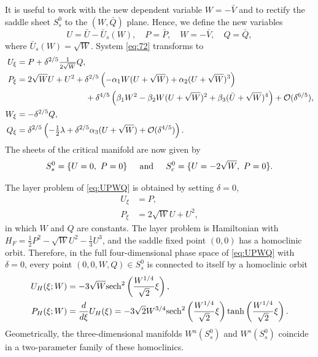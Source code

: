\documentclass[11pt]{article}
\numberwithin{equation}{section}
\begin{document}
It is useful to work with the new dependent variable $W= - \bar{V}$ and to rectify the saddle sheet $S_s^0$ to the $(W,\bar{Q})$ plane.
Hence, we define the new variables
\begin{equation}
    U = \bar{U} - \bar{U}_s(W), \quad
    P = \bar{P}, \quad
    W = - \bar{V}, \quad 
    Q = \bar{Q},
\end{equation}
where $\bar{U}_s(W)=\sqrt{W}$.
System \eqref{eq:72} transforms to 
\begin{equation}\label{eq:UPWQ} 
\begin{split}
    U_\xi &= P + \delta^{2/5} \tfrac{1}{2\sqrt{W}} Q, \\
    P_\xi &= 2 \sqrt{W} U + U^2  
                    + \delta^{2/5} \left( -\alpha_1 W (U + \sqrt{W}) + \alpha_2 (U + \sqrt{W})^3\right) \\
               &{\hskip1.15truein} + \delta^{4/5}\left( \beta_1 W^2 - \beta_2 W (U + \sqrt{W})^2 + \beta_3 ({\bar U} + \sqrt{W})^4 \right) 
                    + \mathcal{O}(\delta^{6/5}), \\
    W_\xi &= - \delta^{2/5} Q, \\      
    Q_\xi &= \delta^{2/5} \left(-\tfrac{1}{2} \lambda + \delta^{2/5}\alpha_3 (U + \sqrt{W})  + \mathcal O(\delta^{4/5}) \right).
\end{split}
\end{equation}
The sheets of the critical manifold are now given by
\begin{equation}\label{eq:S0-sec7}
    S_s^0 = \{ U = 0, \, \, P=0 \} 
    \hskip0.2truein {\rm and} \hskip0.2truein
    S_c^0 = \{ U=-2\sqrt{W}, \, \, P=0 \}. 
\end{equation}

The layer problem of \eqref{eq:UPWQ} is obtained by setting $\delta=0$,
\begin{equation*}\label{eq:HF} 
    \begin{split}
        U_\xi &= P, \\
        P_\xi &= 2 \sqrt{W} U + U^2,
    \end{split}
\end{equation*}
in which $W$ and $Q$ are constants.
The layer problem is Hamiltonian with 
$H_F = \tfrac{1}{2}P^2 - \sqrt{W} U^2 - \tfrac{1}{3} U^3$,
and the saddle fixed point $(0,0)$ has a homoclinic orbit.
Therefore, in the full four-dimensional phase space of 
\eqref{eq:UPWQ} with $\delta=0$, every point $(0,0,W,Q) \in S_s^0$ is connected to itself by a homoclinic orbit 
\begin{equation}\label{eq:UH}
  \begin{split}
U_H(\xi;W) &= - 3 \sqrt{W} {\rm sech}^2\left( \frac{W^{1/4}}{\sqrt{2}} \xi \right), \\
P_H(\xi;W) &= \frac{d}{d\xi} U_H(\xi) =  -3 \sqrt{2} W^{3/4} {\rm sech}^2\left( \frac{W^{1/4}}{\sqrt{2}}\xi \right) 
{\rm tanh}\left( \frac{W^{1/4}}{\sqrt{2}} \xi  \right).
  \end{split}
\end{equation}
Geometrically, the three-dimensional manifolds $W^u(S_s^0)$ and $W^s(S_s^0)$ coincide in a two-parameter family of these homoclinics.
\end{document}
